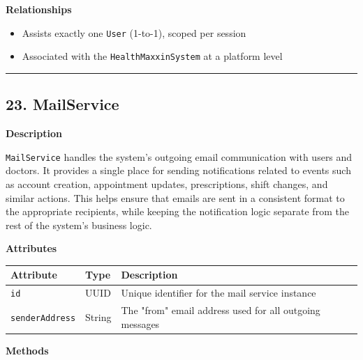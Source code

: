 \documentclass[12pt, a4paper]{article}
\begin{document}
\textbf{Relationships}

\begin{itemize}
    \item Assists exactly one \texttt{User} (1-to-1), scoped per session
    \item Associated with the \texttt{HealthMaxxinSystem} at a platform level
\end{itemize}

\par\medskip\hrule\medskip

\subsection{23. MailService}\label{sec:23-mailservice}

\textbf{Description}

\texttt{MailService} handles the system's outgoing email communication with users and doctors. It provides a single place for sending notifications related to events such as account creation, appointment updates, prescriptions, shift changes, and similar actions. This helps ensure that emails are sent in a consistent format to the appropriate recipients, while keeping the notification logic separate from the rest of the system's business logic.

\textbf{Attributes}

\begin{center}
\small
\renewcommand{\arraystretch}{1.35}
\begin{tabularx}{\textwidth}{|>{\raggedright\arraybackslash}p{3.4cm}|>{\raggedright\arraybackslash}p{3.3cm}|Y|}
\hline
{}
\textbf{Attribute} & \textbf{Type} & \textbf{Description} \\ \hline
\texttt{id} & UUID & Unique identifier for the mail service instance \\ \hline
\texttt{senderAddress} & String & The "from" email address used for all outgoing messages \\ \hline
\end{tabularx}
\end{center}

\textbf{Methods}
\end{document}
